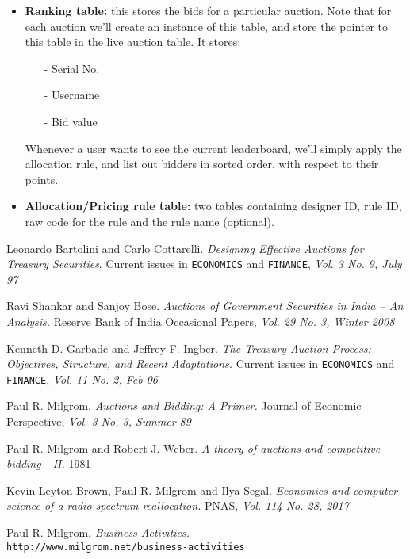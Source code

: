 \documentclass[a4paper]{article}
\begin{document}
\begin{itemize}
    \item \textbf{Ranking table:} this stores the bids for a particular auction. Note that for each auction we'll create an instance of this table, and store the pointer to this table in the live auction table. 
    It stores:
    \begin{itemize}
        \item[-] Serial No.
        \item[-] Username
        \item[-] Bid value
    \end{itemize}
    Whenever a user wants to see the current leaderboard, we'll simply apply the allocation rule, and list out bidders in sorted order, with respect to their points.

    \item \textbf{Allocation/Pricing rule table:} two tables containing designer ID, rule ID, raw code for the rule and the rule name (optional).
\end{itemize}



\pagebreak
\begin{thebibliography}{9}

Leonardo Bartolini and Carlo Cottarelli.
\textit{Designing Effective Auctions for Treasury Securities}. 
Current issues in \texttt{ECONOMICS} and \texttt{FINANCE}, \textit{Vol. 3 No. 9, July 97}

Ravi Shankar and Sanjoy Bose. 
\textit{Auctions of Government Securities in India – An Analysis.}
Reserve Bank of India Occasional Papers,\textit{ Vol. 29 No. 3, Winter 2008}

Kenneth D. Garbade and Jeffrey F. Ingber.
\textit{The Treasury Auction Process: Objectives, Structure, and Recent Adaptations.}
Current issues in \texttt{ECONOMICS} and \texttt{FINANCE}, \textit{Vol. 11 No. 2, Feb 06}

\bibitem{}
Paul R. Milgrom.
\textit{Auctions and Bidding: A Primer.}
Journal of Economic Perspective, \textit{Vol. 3 No. 3, Summer 89}

\bibitem{}
Paul R. Milgrom and Robert J. Weber.
\textit{A theory of auctions and competitive bidding - II.}
1981

\bibitem{}
Kevin Leyton-Brown, Paul R. Milgrom and Ilya Segal.
\textit{Economics and computer science of a radio spectrum reallocation.}
PNAS, \textit{Vol. 114 No. 28, 2017}

Paul R. Milgrom.
\textit{Business Activities.}
\\\texttt{http://www.milgrom.net/business-activities}
\end{thebibliography}
\end{document}
